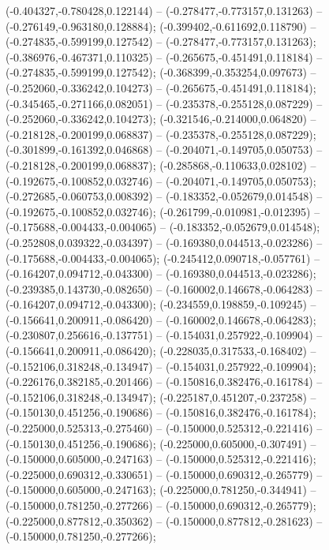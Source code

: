  (-0.404327,-0.780428,0.122144) -- (-0.278477,-0.773157,0.131263) -- (-0.276149,-0.963180,0.128884);
 (-0.399402,-0.611692,0.118790) -- (-0.274835,-0.599199,0.127542) -- (-0.278477,-0.773157,0.131263);
 (-0.386976,-0.467371,0.110325) -- (-0.265675,-0.451491,0.118184) -- (-0.274835,-0.599199,0.127542);
 (-0.368399,-0.353254,0.097673) -- (-0.252060,-0.336242,0.104273) -- (-0.265675,-0.451491,0.118184);
 (-0.345465,-0.271166,0.082051) -- (-0.235378,-0.255128,0.087229) -- (-0.252060,-0.336242,0.104273);
 (-0.321546,-0.214000,0.064820) -- (-0.218128,-0.200199,0.068837) -- (-0.235378,-0.255128,0.087229);
 (-0.301899,-0.161392,0.046868) -- (-0.204071,-0.149705,0.050753) -- (-0.218128,-0.200199,0.068837);
 (-0.285868,-0.110633,0.028102) -- (-0.192675,-0.100852,0.032746) -- (-0.204071,-0.149705,0.050753);
 (-0.272685,-0.060753,0.008392) -- (-0.183352,-0.052679,0.014548) -- (-0.192675,-0.100852,0.032746);
 (-0.261799,-0.010981,-0.012395) -- (-0.175688,-0.004433,-0.004065) -- (-0.183352,-0.052679,0.014548);
 (-0.252808,0.039322,-0.034397) -- (-0.169380,0.044513,-0.023286) -- (-0.175688,-0.004433,-0.004065);
 (-0.245412,0.090718,-0.057761) -- (-0.164207,0.094712,-0.043300) -- (-0.169380,0.044513,-0.023286);
 (-0.239385,0.143730,-0.082650) -- (-0.160002,0.146678,-0.064283) -- (-0.164207,0.094712,-0.043300);
 (-0.234559,0.198859,-0.109245) -- (-0.156641,0.200911,-0.086420) -- (-0.160002,0.146678,-0.064283);
 (-0.230807,0.256616,-0.137751) -- (-0.154031,0.257922,-0.109904) -- (-0.156641,0.200911,-0.086420);
 (-0.228035,0.317533,-0.168402) -- (-0.152106,0.318248,-0.134947) -- (-0.154031,0.257922,-0.109904);
 (-0.226176,0.382185,-0.201466) -- (-0.150816,0.382476,-0.161784) -- (-0.152106,0.318248,-0.134947);
 (-0.225187,0.451207,-0.237258) -- (-0.150130,0.451256,-0.190686) -- (-0.150816,0.382476,-0.161784);
 (-0.225000,0.525313,-0.275460) -- (-0.150000,0.525312,-0.221416) -- (-0.150130,0.451256,-0.190686);
 (-0.225000,0.605000,-0.307491) -- (-0.150000,0.605000,-0.247163) -- (-0.150000,0.525312,-0.221416);
 (-0.225000,0.690312,-0.330651) -- (-0.150000,0.690312,-0.265779) -- (-0.150000,0.605000,-0.247163);
 (-0.225000,0.781250,-0.344941) -- (-0.150000,0.781250,-0.277266) -- (-0.150000,0.690312,-0.265779);
 (-0.225000,0.877812,-0.350362) -- (-0.150000,0.877812,-0.281623) -- (-0.150000,0.781250,-0.277266);

